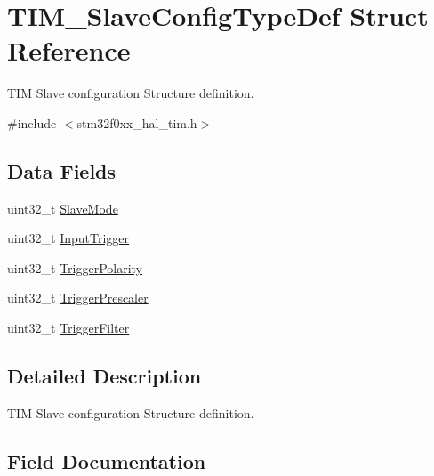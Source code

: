 \hypertarget{struct_t_i_m___slave_config_type_def}{}\section{T\+I\+M\+\_\+\+Slave\+Config\+Type\+Def Struct Reference}
\label{struct_t_i_m___slave_config_type_def}


T\+IM Slave configuration Structure definition.  




{\ttfamily \#include $<$stm32f0xx\+\_\+hal\+\_\+tim.\+h$>$}

\subsection*{Data Fields}
\begin{DoxyCompactItemize}
\item 
uint32\+\_\+t \hyperlink{struct_t_i_m___slave_config_type_def_aa2b0001c7fceb00968ca503040874b4a}{Slave\+Mode}
\item 
uint32\+\_\+t \hyperlink{struct_t_i_m___slave_config_type_def_a11eb45de70bcf3e3111a2d39bfc77074}{Input\+Trigger}
\item 
uint32\+\_\+t \hyperlink{struct_t_i_m___slave_config_type_def_afd12184c6e590581c775504a2e6c048c}{Trigger\+Polarity}
\item 
uint32\+\_\+t \hyperlink{struct_t_i_m___slave_config_type_def_aa2906798e3808ed40ac203a741512b55}{Trigger\+Prescaler}
\item 
uint32\+\_\+t \hyperlink{struct_t_i_m___slave_config_type_def_aef9e224ccafea4bfdd64193ea84feaf3}{Trigger\+Filter}
\end{DoxyCompactItemize}


\subsection{Detailed Description}
T\+IM Slave configuration Structure definition. 

\subsection{Field Documentation}
\mbox{\label{struct_t_i_m___slave_config_type_def_a11eb45de70bcf3e3111a2d39bfc77074}} 
